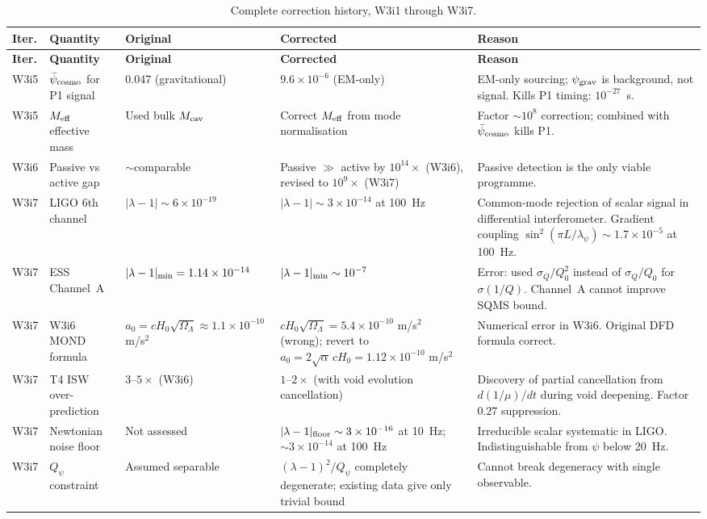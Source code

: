 \documentclass[11pt]{article}
\newcommand{\lam}{\lambda}
\newcommand{\Meff}{M_{\rm eff}}
\newcommand{\ee}[1]{\times 10^{#1}}
\newcommand{\Qpsi}{Q_\psi}
\newcommand{\lbone}{|\lam - 1|}
\newcommand{\psicosmo}{\bar{\psi}_{\rm cosmo}}
\newcommand{\Hzero}{H_0}
\newcommand{\aM}{a_0}
\theoremstyle{definition}
\theoremstyle{remark}
\begin{document}
\begin{longtable}{@{}p{1cm}p{3cm}p{3cm}p{3cm}p{3cm}@{}}
\caption{Complete correction history, W3i1 through W3i7.}
\label{tab:full_corrections}\\
\toprule
\textbf{Iter.} & \textbf{Quantity} & \textbf{Original} &
  \textbf{Corrected} & \textbf{Reason} \\
\midrule
\endfirsthead
\toprule
\textbf{Iter.} & \textbf{Quantity} & \textbf{Original} &
  \textbf{Corrected} & \textbf{Reason} \\
\midrule
\endhead
\bottomrule
\endlastfoot
%
W3i5 & $\psicosmo$ for P1 signal & 0.047 (gravitational) &
  $9.6\ee{-6}$ (EM-only) & EM-only sourcing; $\psi_{\rm grav}$ is
  background, not signal. Kills P1 timing: $10^{-27}$~s. \\
\midrule
W3i5 & $\Meff$ effective mass & Used bulk $M_{\rm cav}$ &
  Correct $\Meff$ from mode normalisation & Factor $\sim 10^8$
  correction; combined with $\psicosmo$ kills P1. \\
\midrule
W3i6 & Passive vs active gap & $\sim$comparable & Passive $\gg$
  active by $10^{14}\times$ (W3i6), revised to $10^9\times$ (W3i7) &
  Passive detection is the only viable programme. \\
\midrule
W3i7 & LIGO 6th channel & $\lbone \sim 6\ee{-19}$ &
  $\lbone \sim 3\ee{-14}$ at 100~Hz &
  Common-mode rejection of scalar signal in differential
  interferometer. Gradient coupling $\sin^2(\pi L/\lambda_\psi)
  \sim 1.7\ee{-5}$ at 100~Hz. \\
\midrule
W3i7 & ESS Channel~A & $\lbone_{\rm min} = 1.14\ee{-14}$ &
  $\lbone_{\rm min} \sim 10^{-7}$ &
  Error: used $\sigma_Q/Q_0^2$ instead of $\sigma_Q/Q_0$ for
  $\sigma(1/Q)$. Channel~A cannot improve SQMS bound. \\
\midrule
W3i7 & W3i6 MOND formula & $\aM = c\Hzero\sqrt{\Omega_\Lambda}
  \approx 1.1\ee{-10}$ m/s$^2$ & $c\Hzero\sqrt{\Omega_\Lambda}
  = 5.4\ee{-10}$ m/s$^2$ (wrong); revert to
  $\aM = 2\sqrt{\alpha}\,c\Hzero = 1.12\ee{-10}$ m/s$^2$ &
  Numerical error in W3i6. Original DFD formula correct. \\
\midrule
W3i7 & T4 ISW over-prediction & $3$--$5\times$ (W3i6) &
  $1$--$2\times$ (with void evolution cancellation) &
  Discovery of partial cancellation from $d(1/\mu)/dt$ during
  void deepening. Factor $0.27$ suppression. \\
\midrule
W3i7 & Newtonian noise floor & Not assessed & $\lbone_{\rm floor}
  \sim 3\ee{-16}$ at 10~Hz; $\sim 3\ee{-14}$ at 100~Hz &
  Irreducible scalar systematic in LIGO. Indistinguishable from
  $\psi$ below 20~Hz. \\
\midrule
W3i7 & $\Qpsi$ constraint & Assumed separable & $(\lam-1)^2/\Qpsi$
  completely degenerate; existing data give only trivial bound &
  Cannot break degeneracy with single observable. \\
\bottomrule
\end{longtable}
\end{document}
